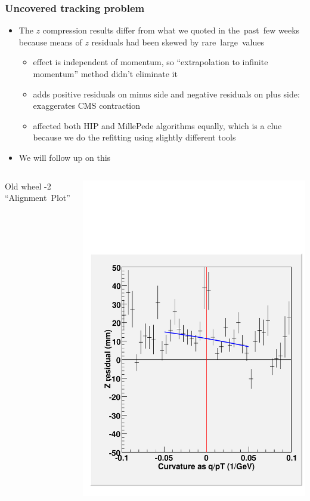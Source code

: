 \documentclass[compress]{beamer}
\begin{document}
\begin{frame}
\frametitle{Uncovered tracking problem}
\begin{itemize}
\item The $z$ compression results differ from what we quoted in \mbox{the past few\hspace{-1 cm}}
  weeks because means of $z$ residuals had been skewed by \mbox{rare large values\hspace{-1 cm}}
\begin{itemize}
\item effect is independent of momentum, so ``extrapolation to
  infinite momentum'' method didn't eliminate it
\item adds positive residuals on minus side and negative residuals on plus side: exaggerates CMS contraction
\item affected both HIP and MillePede algorithms equally, which is a
  clue because we do the refitting using slightly different tools
\end{itemize}
\item We will follow up on this
\end{itemize}

\vfill
\begin{columns}
\scriptsize Old wheel -2 \mbox{``Alignment Plot''\hspace{-1 cm}}

\includegraphics[width=\linewidth]{oprof_whm2_nocut.pdf}


\end{columns}
\end{frame}
\end{document}
